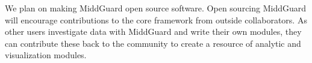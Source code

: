 \documentclass[midd]{thesis}
\begin{document}
We plan on making MiddGuard open source software. Open sourcing MiddGuard will
encourage contributions to the core framework from outside collaborators. As
other users investigate data with MiddGuard and write their own modules, they
can contribute these back to the community to create a resource of analytic and
visualization modules.

\appendix

\newcommand{\middguardjs}[2][]{
  
  \vfill
  \columnbreak
}

\newcommand{\middguardcode}[2][]{
  
  \vfill
  \columnbreak
}
\end{document}
